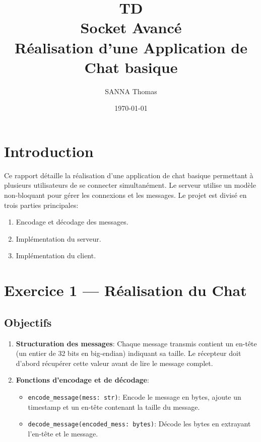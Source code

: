 \documentclass{article}
\begin{document}
\begin{titlepage}
  \title{TD\\Socket Avancé\\Réalisation d'une Application de Chat basique}
  \author{SANNA Thomas}
  \date{\today}
  \maketitle
\end{titlepage}

\section{Introduction}

Ce rapport détaille la réalisation d'une application de chat basique permettant à plusieurs utilisateurs de se connecter simultanément. Le serveur utilise un modèle non-bloquant pour gérer les connexions et les messages. Le projet est divisé en trois parties principales:
\begin{enumerate}
    \item Encodage et décodage des messages.
    \item Implémentation du serveur.
    \item Implémentation du client.
\end{enumerate}

\section{Exercice 1 — Réalisation du Chat}

\subsection{Objectifs}

\begin{enumerate}
    \item \textbf{Structuration des messages}: Chaque message transmis contient un en-tête (un entier de 32 bits en big-endian) indiquant sa taille. Le récepteur doit d'abord récupérer cette valeur avant de lire le message complet.
    \item \textbf{Fonctions d'encodage et de décodage}:
    \begin{itemize}
        \item \texttt{encode\_message(mess: str)}: Encode le message en bytes, ajoute un timestamp et un en-tête contenant la taille du message.
        \item \texttt{decode\_message(encoded\_mess: bytes)}: Décode les bytes en extrayant l'en-tête et le message.
    \end{itemize}
\end{enumerate}
\end{document}
